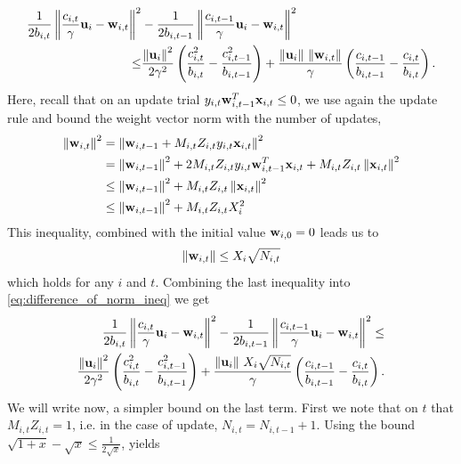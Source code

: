 {\begin{equation}
\begin{split}
\frac{1}{2b_{i,t}}\left\Vert {\frac{c_{i,t}}{\gamma} \mathbf{u}_i-\mathbf{w}_{i,t}} \right\Vert^2&-\frac{1}{2b_{i,t-1}}\left\Vert {\frac{c_{i,t-1}}{\gamma} \mathbf{u}_i-\mathbf{w}_{i,t}} \right\Vert^2\\
\le&\frac{\left\Vert {\mathbf{u}_i} \right\Vert^2}{2\gamma^2}\left({\frac{c_{i,t}^2}{b_{i,t}}-\frac{c_{i,t-1}^2}{b_{i,t-1}}}\right)+
\frac{\Vert\mathbf{u}_i\Vert~\Vert\mathbf{w}_{i,t}\Vert}{\gamma}\left({\frac{c_{i,t-1}}{b_{i,t-1}}-\frac{c_{i,t}}{b_{i,t}}}\right).
\end{split}
\label{eq:difference_of_norm_ineq}
\end{equation}
Here, recall that on an update trial $y_{i,t}\mathbf{w}_{i,t-1}^{T}\mathbf{x}_{i,t}\le0$, we use again the update rule and  bound the weight vector norm with the number of updates, 
\begin{equation*}
\begin{split}
\left\Vert {\mathbf{w}_{i,t}} \right\Vert^2&=\left\Vert {\mathbf{w}_{i,t-1}+M_{i,t}Z_{i,t}y_{i,t}\mathbf{x}_{i,t}} \right\Vert^2\\
&=\left\Vert {\mathbf{w}_{i,t-1}} \right\Vert^2+ 2M_{i,t}Z_{i,t}y_{i,t}\mathbf{w}_{i,t-1}^{T}\mathbf{x}_{i,t}+M_{i,t}Z_{i,t}\left\Vert {\mathbf{x}_{i,t}} \right\Vert^2\\
&\le\left\Vert {\mathbf{w}_{i,t-1}} \right\Vert^2+M_{i,t}Z_{i,t}\left\Vert {\mathbf{x}_{i,t}} \right\Vert^2\\
&\le\left\Vert {\mathbf{w}_{i,t-1}} \right\Vert^2+M_{i,t}Z_{i,t}X_i^2
\end{split}
\end{equation*}
This inequality, combined with the initial value $\mathbf{w}_{i,0}=0$ leads us to
\begin{equation}
\Vert\mathbf{w}_{i,t}\Vert\le X_i\sqrt{N_{i,t}}
\label{eq:bound_on_w}
\end{equation}
which holds for any $i$ and $t$. Combining the last inequality into   \eqref{eq:difference_of_norm_ineq} we get
\begin{equation}
\begin{split}
\frac{1}{2b_{i,t}}\left\Vert {\frac{c_{i,t}}{\gamma} \mathbf{u}_i-\mathbf{w}_{i,t}} \right\Vert^2-\frac{1}{2b_{i,t-1}}\left\Vert {\frac{c_{i,t-1}}{\gamma} \mathbf{u}_i-\mathbf{w}_{i,t}} \right\Vert^2\le\\
\frac{\left\Vert {\mathbf{u}_i} \right\Vert^2}{2\gamma^2}\left({\frac{c_{i,t}^2}{b_{i,t}}-\frac{c_{i,t-1}^2}{b_{i,t-1}}}\right)+
\frac{\Vert\mathbf{u}_i\Vert~ X_i\sqrt{ N_{i,t}}}{\gamma}\left({\frac{c_{i,t-1}}{b_{i,t-1}}-\frac{c_{i,t}}{b_{i,t}}}\right).
\label{eq:difference_of_norm_ineq_2}
\end{split}
\end{equation}
We will write now, a simpler bound on the last term. First we note that on $t$ that $M_{i,t}Z_{i,t}=1$, i.e. in the case of update, $N_{i,t}=N_{i,t-1}+1$. Using the bound $\sqrt{1+x}-\sqrt{x}\le\frac{1}{2\sqrt{x}}$, yields 
}
